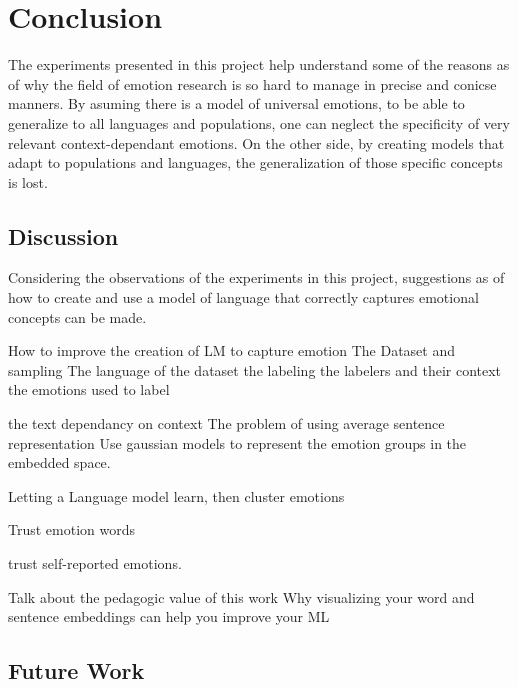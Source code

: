 \chapter{Conclusion}\label{chap:Conclusion}
The experiments presented in this project help understand some of the reasons as of why the field of emotion research is so hard to manage in precise and conicse manners. By asuming there is a model of universal emotions, to be able to generalize to all languages and populations, one can neglect the specificity of very relevant context-dependant emotions. On the other side, by creating models that adapt to populations and languages, the generalization of those specific concepts is lost.

\section{Discussion}\label{sec:Discussion}
Considering the observations of the experiments in this project, suggestions as of how to create and use a model of language that correctly captures emotional concepts can be made.

How to improve the creation of LM to capture emotion
The Dataset and sampling
The language of the dataset
the labeling
the labelers and their context
the emotions used to label

the text dependancy on context
The problem of using average sentence representation
Use gaussian models to represent the emotion groups in the embedded space.

Letting a Language model learn, then cluster emotions




Trust emotion words

trust self-reported emotions.


Talk about the pedagogic value of this work
Why visualizing your word and sentence embeddings can help you improve your ML




\section{Future Work}\label{sec:Future Work}

